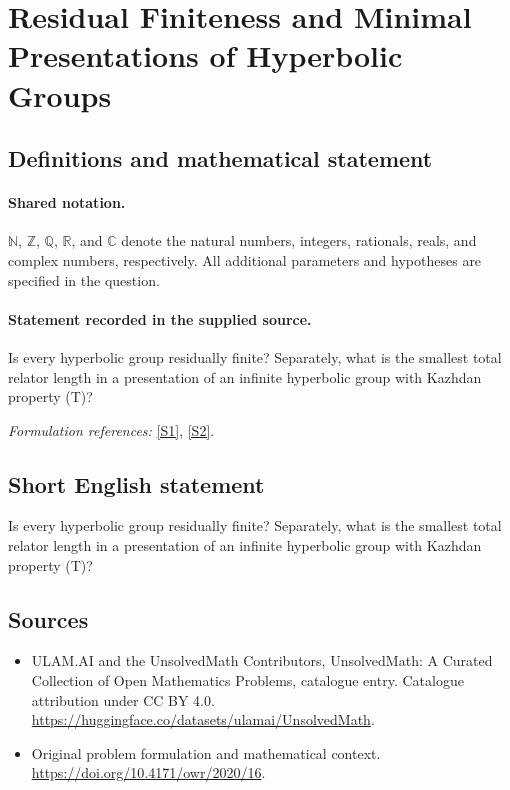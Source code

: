 \documentclass[11pt]{article}
\newcommand{\sref}[2]{\hyperlink{source:#1:#2}{[S#2]}}
\begin{document}
\section{Residual Finiteness and Minimal Presentations of Hyperbolic Groups}\label{statement}

\subsection{Definitions and mathematical statement}

\paragraph{Shared notation.}$\mathbb N$, $\mathbb Z$, $\mathbb Q$, $\mathbb R$, and $\mathbb C$ denote the natural numbers, integers, rationals, reals, and complex numbers, respectively. All additional parameters and hypotheses are specified in the question.


\paragraph{Statement recorded in the supplied source.}
Is every hyperbolic group residually finite? Separately, what is the smallest total relator length in a presentation of an infinite hyperbolic group with Kazhdan property (T)?
\par\smallskip\textit{Formulation references:} \sref{statement}{1}, \sref{statement}{2}.
\subsection{Short English statement}
Is every hyperbolic group residually finite? Separately, what is the smallest total relator length in a presentation of an infinite hyperbolic group with Kazhdan property (T)?
\subsection{Sources}
\begin{itemize}
\item[\hypertarget{source:statement:1}{S1}] ULAM.AI and the UnsolvedMath Contributors, UnsolvedMath: A Curated Collection of Open Mathematics Problems, catalogue entry. Catalogue attribution under CC BY 4.0.
\url{https://huggingface.co/datasets/ulamai/UnsolvedMath}.
\item[\hypertarget{source:statement:2}{S2}] Original problem formulation and mathematical context.
\url{https://doi.org/10.4171/owr/2020/16}.
\end{itemize}
\label{end:statement}
\end{document}
